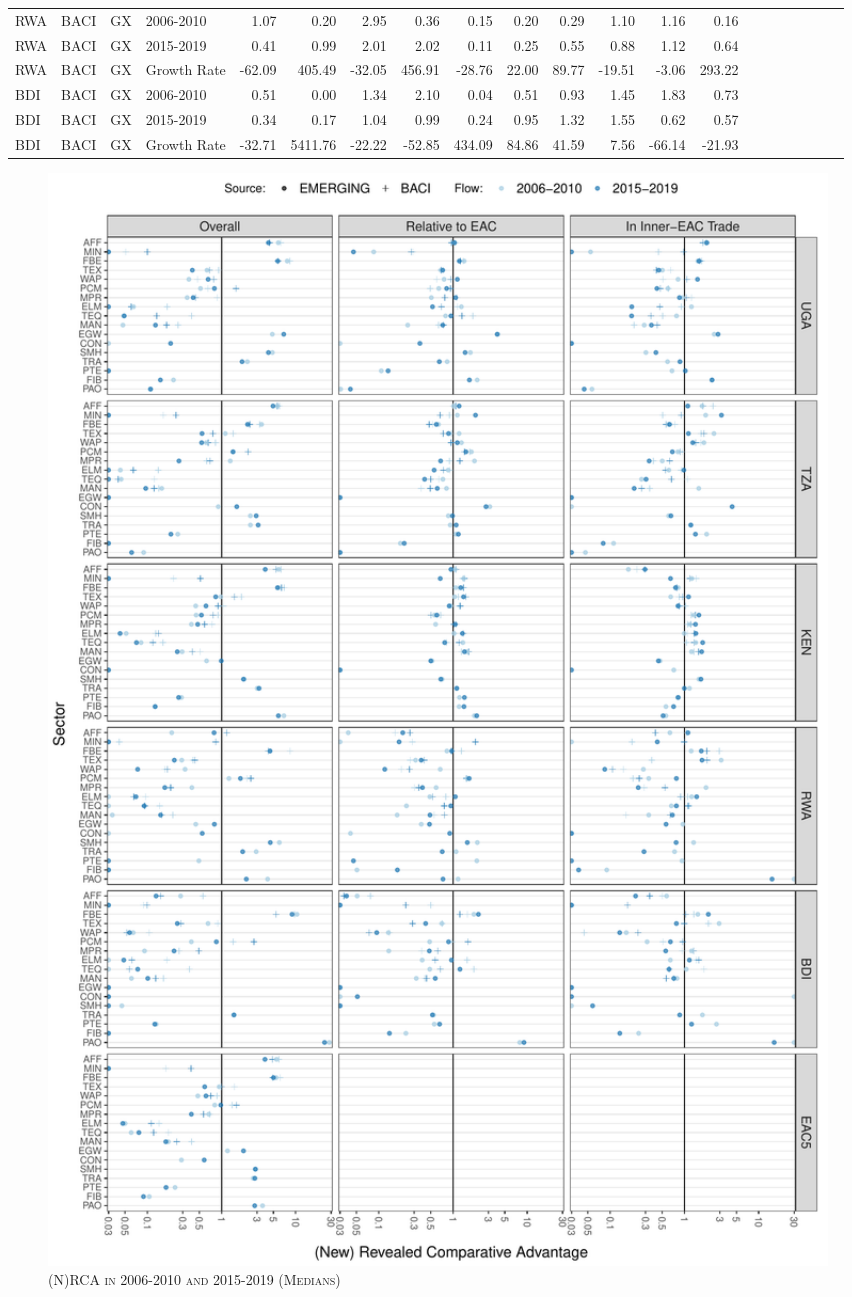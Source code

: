 \documentclass[a4paper]{article}
\begin{document}
\begin{table}[ht]
{\begin{tabular}{llllrrrrrrrrrrrrrrrrr}
  RWA & BACI & GX & 2006-2010 & 1.07 & 0.20 & 2.95 & 0.36 & 0.15 & 0.20 & 0.29 & 1.10 & 1.16 & 0.16 &  &  &  &  &  &  &  \\ 
  RWA & BACI & GX & 2015-2019 & 0.41 & 0.99 & 2.01 & 2.02 & 0.11 & 0.25 & 0.55 & 0.88 & 1.12 & 0.64 &  &  &  &  &  &  &  \\ 
  RWA & BACI & GX & Growth Rate & -62.09 & 405.49 & -32.05 & 456.91 & -28.76 & 22.00 & 89.77 & -19.51 & -3.06 & 293.22 &  &  &  &  &  &  &  \\ 
  BDI & BACI & GX & 2006-2010 & 0.51 & 0.00 & 1.34 & 2.10 & 0.04 & 0.51 & 0.93 & 1.45 & 1.83 & 0.73 &  &  &  &  &  &  &  \\ 
  BDI & BACI & GX & 2015-2019 & 0.34 & 0.17 & 1.04 & 0.99 & 0.24 & 0.95 & 1.32 & 1.55 & 0.62 & 0.57 &  &  &  &  &  &  &  \\ 
  BDI & BACI & GX & Growth Rate & -32.71 & 5411.76 & -22.22 & -52.85 & 434.09 & 84.86 & 41.59 & 7.56 & -66.14 & -21.93 &  &  &  &  &  &  &  \\ \bottomrule
\end{tabular}
}
\end{table}


\begin{figure}[h!]
\centering
\caption{\label{fig:NRCA_Diff}\textsc{(N)RCA in 2006-2010 and 2015-2019 (Medians)}}
\includegraphics[width=1\textwidth]{"NRCA_EAC5_DIFF_ALL.pdf"} \end{figure}
\FloatBarrier
\end{document}
